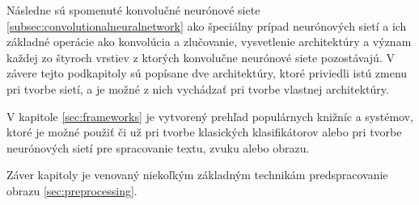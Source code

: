 Následne sú spomenuté konvolučné neurónové siete \ref{subsec:convolutionalneuralnetwork} ako špeciálny prípad neurónových sietí a ich základné operácie ako konvolúcia a zlučovanie,
    vysvetlenie architektúry a význam každej zo štyroch vrstiev z ktorých konvolučne neurónové siete pozostávajú.
V závere tejto podkapitoly sú popísane dve architektúry, ktoré priviedli istú zmenu pri tvorbe sietí, a je možné z nich vychádzať pri tvorbe vlastnej architektúry.

V kapitole \ref{sec:frameworks} je vytvorený prehľad populárnych knižníc a systémov, ktoré je možné použiť či už pri tvorbe klasických klasifikátorov alebo
    pri tvorbe neurónových sietí pre spracovanie textu, zvuku alebo obrazu.

Záver kapitoly je venovaný niekoľkým základným technikám predspracovanie obrazu \ref{sec:preprocessing}.
